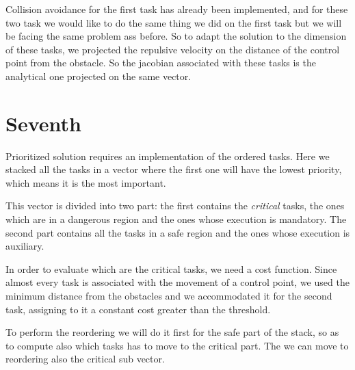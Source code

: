 \documentclass[12pt, a4paper]{article}
\begin{document}
Collision avoidance for the first task has already been implemented, and for these two task we would like to do the same thing we did on the first task but we will be facing the same problem ass before. So to adapt the solution to the dimension of these tasks, we projected the repulsive velocity on the distance of the control point from the obstacle.
So the jacobian associated with these tasks is the analytical one projected on the same vector.

\section{Seventh}

Prioritized solution requires an implementation of the ordered tasks. Here we stacked all the tasks in a vector where the first one will have the lowest priority, which means it is the most important.

This vector is divided into two part: the first contains the \textit{critical} tasks, the ones which are in a dangerous region and the ones whose execution is mandatory. The second part contains all the tasks in a safe region and the ones whose execution is auxiliary.

In order to evaluate which are the critical tasks, we need a cost function. Since almost every task is associated with the movement of a control point, we used the minimum distance from the obstacles and we accommodated it for the second task, assigning to it a constant cost greater than the threshold.

To perform the reordering we will do it first for the safe part of the stack, so as to compute also which tasks has to move to the critical part. The we can move to reordering also the critical sub vector.
\end{document}
